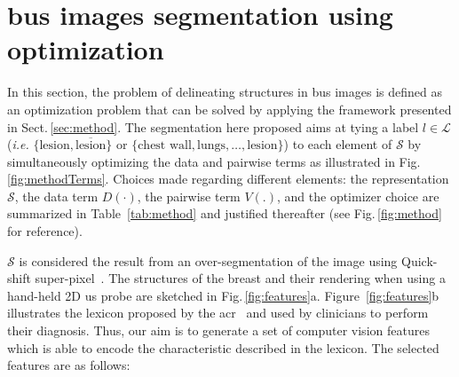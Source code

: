 \section{\ac{bus} images segmentation using optimization}\label{sec:methodApp}
In this section, the problem of delineating structures in \ac{bus} images is defined as an optimization problem that can be solved by applying the framework presented in Sect.\,\ref{sec:method}.
The segmentation here proposed aims at tying a label $l\in\mathcal{L}$ (\emph{i.e.} $\{\text{lesion}, \overline{\text{lesion}}\}$ or $\{ \text{chest wall}, \text{lungs}, \dots, \text{lesion} \}$) to each element of $\mathcal{S}$ by simultaneously optimizing the data and pairwise terms as illustrated in Fig.\,\ref{fig:methodTerms}.
Choices made regarding different elements:
the representation $\mathcal{S}$, the data term $D(\cdot)$, the pairwise term $V(.)$, and the optimizer choice are summarized in Table~\ref{tab:method} and justified thereafter (see Fig.\,\ref{fig:method} for reference).

$\mathcal{S}$ is considered the result from an over-segmentation of the image using Quick-shift super-pixel~\cite{achanta2012slic}.
The structures of the breast and their rendering when using a hand-held 2D \ac{us} probe are sketched in Fig.\,\ref{fig:features}a. Figure~\ref{fig:features}b illustrates the lexicon proposed by the \ac{acr}~\cite{biradsus} and used by clinicians to perform their diagnosis. Thus, our aim is to generate a set of computer vision features which is able to encode the characteristic described in the lexicon.
The selected features are as follows:

